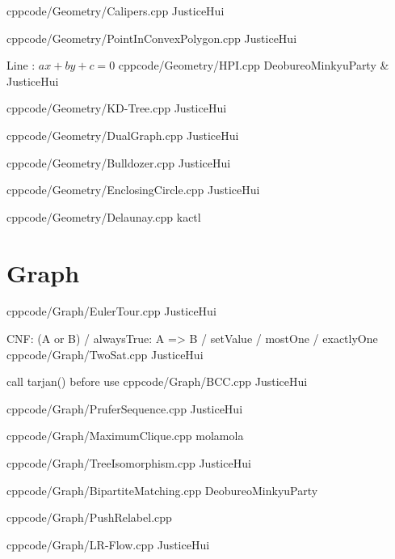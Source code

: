 \documentclass[landscape, 8pt, a4paper, oneside, twocolumn]{extarticle}
\begin{document}
{}{}
{cpp}{code/Geometry/Calipers.cpp}
{JusticeHui}

{}{}
{cpp}{code/Geometry/PointInConvexPolygon.cpp}
{JusticeHui}

{Line : $ax + by + c = 0$}{}
{cpp}{code/Geometry/HPI.cpp}
{DeobureoMinkyuParty & JusticeHui}

{}{}
{cpp}{code/Geometry/KD-Tree.cpp}
{JusticeHui}

{}{}
{cpp}{code/Geometry/DualGraph.cpp}
{JusticeHui}

{}{}
{cpp}{code/Geometry/Bulldozer.cpp}
{JusticeHui}

{}{}
{cpp}{code/Geometry/EnclosingCircle.cpp}
{JusticeHui}

{}{}
{cpp}{code/Geometry/Delaunay.cpp}
{kactl}

\section{Graph}

{}{}
{cpp}{code/Graph/EulerTour.cpp}
{JusticeHui}

{CNF: (A or B) / alwaysTrue: A => B / setValue / mostOne / exactlyOne}{}
{cpp}{code/Graph/TwoSat.cpp}
{JusticeHui}

{call tarjan() before use}{}
{cpp}{code/Graph/BCC.cpp}
{JusticeHui}

{}{}
{cpp}{code/Graph/PruferSequence.cpp}
{JusticeHui}

{}{}
{cpp}{code/Graph/MaximumClique.cpp}
{molamola}

{}{}
{cpp}{code/Graph/TreeIsomorphism.cpp}
{JusticeHui}

{}{}
{cpp}{code/Graph/BipartiteMatching.cpp}
{DeobureoMinkyuParty}



{}{}
{cpp}{code/Graph/PushRelabel.cpp}
{}

{}{}
{cpp}{code/Graph/LR-Flow.cpp}
{JusticeHui}
\end{document}
